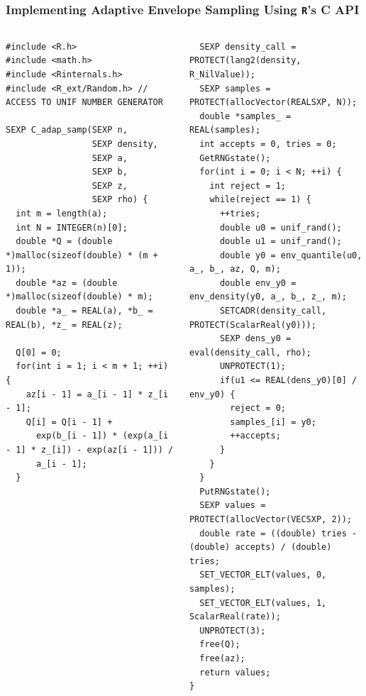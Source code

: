 \documentclass[aspectratio=169]{beamer}
\begin{document}
\begin{frame}[fragile]
  \frametitle{Implementing Adaptive Envelope Sampling Using \texttt{R}'s C API}
\begin{columns}
\begin{column}{0.5\textwidth}
\vspace*{-1.5cm}
\begin{verbatim}
#include <R.h>
#include <math.h>
#include <Rinternals.h>
#include <R_ext/Random.h> // ACCESS TO UNIF NUMBER GENERATOR

SEXP C_adap_samp(SEXP n,
                 SEXP density,
                 SEXP a,
                 SEXP b,
                 SEXP z,
                 SEXP rho) {
  int m = length(a);
  int N = INTEGER(n)[0];
  double *Q = (double *)malloc(sizeof(double) * (m + 1));
  double *az = (double *)malloc(sizeof(double) * m);
  double *a_ = REAL(a), *b_ = REAL(b), *z_ = REAL(z);

  Q[0] = 0;
  for(int i = 1; i < m + 1; ++i) {
    az[i - 1] = a_[i - 1] * z_[i - 1];
    Q[i] = Q[i - 1] + 
      exp(b_[i - 1]) * (exp(a_[i - 1] * z_[i]) - exp(az[i - 1])) / 
      a_[i - 1];
  }
\end{verbatim}
\end{column}
\begin{column}{0.5\textwidth}
\begin{verbatim}
  SEXP density_call = PROTECT(lang2(density, R_NilValue));
  SEXP samples = PROTECT(allocVector(REALSXP, N));
  double *samples_ = REAL(samples);
  int accepts = 0, tries = 0;
  GetRNGstate();
  for(int i = 0; i < N; ++i) {
    int reject = 1;
    while(reject == 1) {
      ++tries;
      double u0 = unif_rand();
      double u1 = unif_rand();
      double y0 = env_quantile(u0, a_, b_, az, Q, m);
      double env_y0 = env_density(y0, a_, b_, z_, m);
      SETCADR(density_call, PROTECT(ScalarReal(y0)));
      SEXP dens_y0 = eval(density_call, rho);
      UNPROTECT(1);
      if(u1 <= REAL(dens_y0)[0] / env_y0) {
        reject = 0;
        samples_[i] = y0;
        ++accepts;
      }
    }
  }
  PutRNGstate();
  SEXP values = PROTECT(allocVector(VECSXP, 2));
  double rate = ((double) tries - (double) accepts) / (double) tries;
  SET_VECTOR_ELT(values, 0, samples);
  SET_VECTOR_ELT(values, 1, ScalarReal(rate));
  UNPROTECT(3);
  free(Q);
  free(az);
  return values;
}
\end{verbatim}
\end{column}
\end{columns}
\end{frame}
\end{document}
